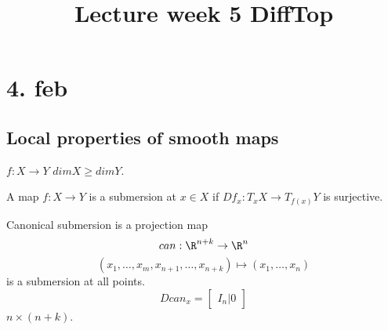 \title{Lecture week 5 DiffTop}
\maketitle
\section{4. feb}
\subsection*{Local properties of smooth maps}
$f: X \to Y$
\newline $dimX\geq dimY$.
\begin{definition}
  A map $f: X \to Y$ is a submersion at $x\in X$ if $Df_x:T_xX \to T_{f(x)}Y$ is surjective.
\end{definition}
\begin{example}
  Canonical submersion is a projection map
    $$can:\R^{n+k}\to \R^n$$
    $$(x_1,\dots,x_m,x_{n+1},\dots,x_{n+k})\mapsto(x_1,\dots,x_n)$$
  is a submersion at all points.
    $$D can_x=
    \begin{bmatrix}
      I_n | 0
    \end{bmatrix}$$
    $n\times(n+k)$.
\end{example}

